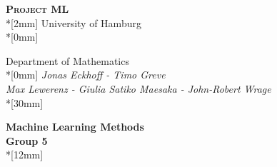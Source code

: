 \begin{titlepage}
\begin{center}                     
        {\Large\scshape \textbf{Project ML}}\\*[2mm]
				{\large University of Hamburg}\\*[0mm]

				{\large Department of Mathematics}\\*[0mm]
				{\large \emph{Jonas Eckhoff - Timo Greve\\ 
Max Lewerenz - Giulia Satiko Maesaka - John-Robert Wrage}}\\*[30mm]
				

        {\bf \LARGE Machine Learning Methods
         \\ Group 5}\\*[12mm]

\end{center}  

\end{titlepage}
\newpage


\setcounter{page}{2}

\tableofcontents
\newpage

\listoffigures
\newpage

\newpage


\setcounter{page}{1}